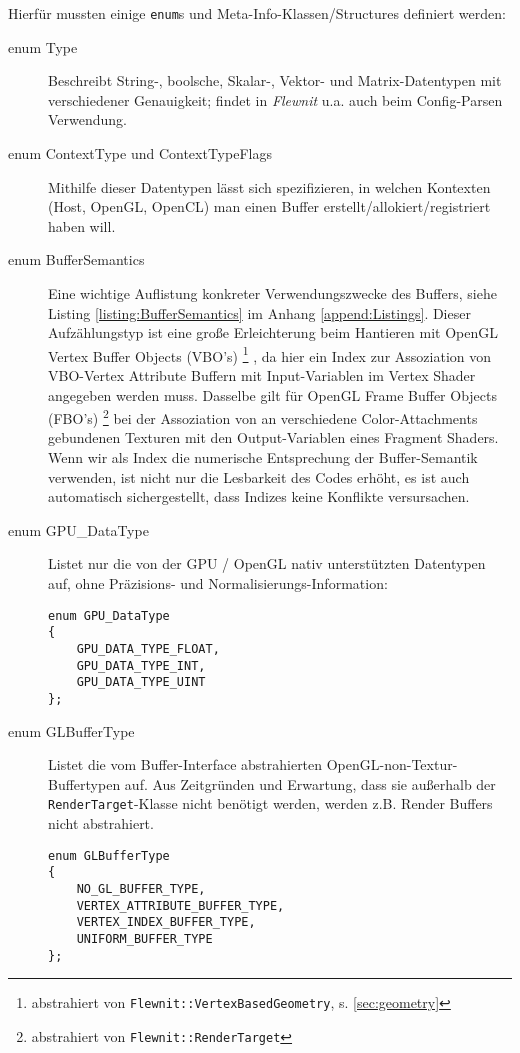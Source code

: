 	Hierfür mussten einige \lstinline|enum|s und Meta-Info-Klassen/Structures definiert werden:
	\begin{description}
		
		\item[enum Type] 
		Beschreibt String-, boolsche, Skalar-, Vektor- und Matrix-Datentypen mit verschiedener 
		Genauigkeit; findet in \emph{Flewnit} u.a. auch beim Config-Parsen Verwendung.
		
		\item[enum ContextType und ContextTypeFlags] 
		Mithilfe dieser Datentypen lässt sich spezifizieren, in welchen
		Kontexten (Host, OpenGL, OpenCL) man einen Buffer erstellt/allokiert/registriert haben will.
		
		\item[enum BufferSemantics] 
		\label{item:BufferSemantics}
		Eine wichtige Auflistung konkreter Verwendungszwecke des Buffers,
		siehe Listing \ref{listing:BufferSemantics} im Anhang \ref{append:Listings}.
		Dieser Aufzählungstyp ist eine große Erleichterung beim Hantieren mit OpenGL Vertex Buffer Objects (VBO's) 
		\footnote{abstrahiert von \lstinline|Flewnit::VertexBasedGeometry|, s. \ref{sec:geometry} }
		, da hier ein Index zur Assoziation von VBO-Vertex Attribute Buffern mit Input-Variablen im Vertex Shader
		angegeben werden muss. Dasselbe gilt für OpenGL Frame Buffer Objects (FBO's) 
		\footnote{abstrahiert von \lstinline|Flewnit::RenderTarget|} bei der Assoziation von
		an verschiedene Color-Attachments gebundenen Texturen mit den Output-Variablen eines Fragment Shaders.
		Wenn wir als Index die numerische Entsprechung der Buffer-Semantik verwenden, 
		ist nicht nur die Lesbarkeit des Codes erhöht, es ist auch automatisch sichergestellt, 
		dass Indizes keine Konflikte versursachen.
		
		\item[enum GPU\_DataType] Listet nur die von der GPU / OpenGL nativ unterstützten Datentypen auf, ohne
		Präzisions- und Normalisierungs-Information:
		\begin{lstlisting}		
enum GPU_DataType
{
	GPU_DATA_TYPE_FLOAT,
	GPU_DATA_TYPE_INT,
	GPU_DATA_TYPE_UINT
};
		\end{lstlisting}
		
		\item[enum GLBufferType]
		Listet die vom Buffer-Interface abstrahierten OpenGL-non-Textur-Buffertypen auf. 
		Aus Zeitgründen und Erwartung, dass sie außerhalb der \lstinline|RenderTarget|-Klasse nicht benötigt werden,
		werden z.B. Render Buffers nicht abstrahiert.
		\begin{lstlisting}		
enum GLBufferType
{
	NO_GL_BUFFER_TYPE,
	VERTEX_ATTRIBUTE_BUFFER_TYPE,
	VERTEX_INDEX_BUFFER_TYPE,
	UNIFORM_BUFFER_TYPE 
};
		\end{lstlisting}	
	

\end{description}
